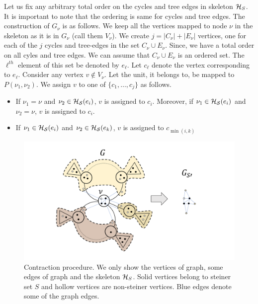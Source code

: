 Let us fix any arbitrary total order on the cycles and tree edges in skeleton ${\cal H}_S$. It is important to note that the ordering is same for cycles and tree edges. The construction of $G_\nu$ is as follows. We keep all the vertices mapped to node $\nu$ in the skeleton as it is in $G_\nu$ (call them $V_\nu$). We create $j = |C_\nu|+|E_\nu|$ vertices, one for each of the $j$ cycles and tree-edges in the set $C_\nu \cup E_\nu$. Since, we have a total order on all cyles and tree edges. We can assume that $C_\nu \cup E_\nu$ is an ordered set. The $\ell^{th}$ element of this set be denoted by $e_\ell$. Let $c_\ell$ denote the vertex corresponding to $e_\ell$. Consider any vertex $v\notin V_\nu$. Let the unit, it belongs to, be mapped to  $P(\nu_1,\nu_2)$. We assign $v$ to one of $\{c_1,\ldots,c_j\}$ as follows.
\begin{itemize}
    \item If $\nu_1=\nu$ and $\nu_2\in {\cal H_S}(e_i)$, $v$ is assigned to $c_i$. Moreover, if  $\nu_1\in {\cal H_S}(e_i)$ and $\nu_2=\nu$, $v$ is assigned to $c_i$.
    \item If $\nu_1 \in {\cal H_S}(e_i)$ and $\nu_2\in {\cal H_S}(e_k)$, $v$ is assigned to $c_{\min(i,k)}$
\end{itemize}

\noindent

\begin{figure}[h]
    \centering
    \includegraphics[width=1.0\textwidth]{src/images/image_contraction.pdf}{}
    \caption{Contraction procedure. We only show the vertices of graph, some edges of graph and the skeleton ${\cal H}_S$. Solid vertices belong to steiner set $S$ and hollow vertices are non-steiner vertices. Blue edges denote some of the graph edges.}
    \label{fig:image-contraction}
\end{figure}

